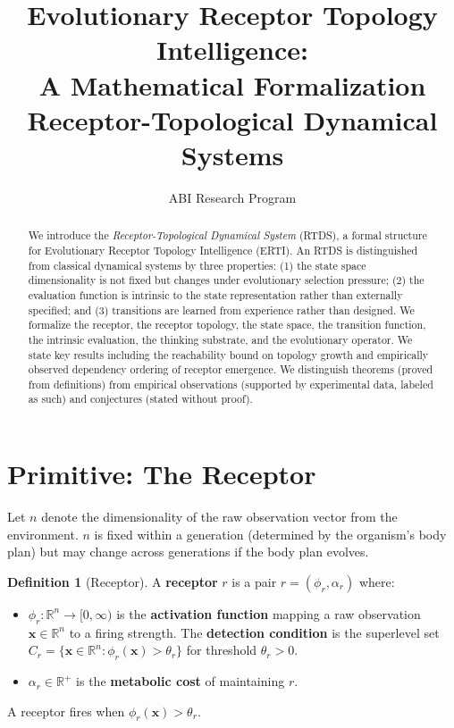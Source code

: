 \documentclass[12pt]{article}
\title{\textbf{Evolutionary Receptor Topology Intelligence:\\
A Mathematical Formalization}\\
\large Receptor-Topological Dynamical Systems}
\author{ABI Research Program}
\date{}
\theoremstyle{definition}
\newtheorem{definition}{Definition}
\begin{document}
\maketitle

\begin{abstract}
We introduce the \textit{Receptor-Topological Dynamical System} (RTDS), a formal structure
for Evolutionary Receptor Topology Intelligence (ERTI). An RTDS is distinguished from
classical dynamical systems by three properties: (1) the state space dimensionality is not
fixed but changes under evolutionary selection pressure; (2) the evaluation function is
intrinsic to the state representation rather than externally specified; and (3) transitions
are learned from experience rather than designed. We formalize the receptor, the receptor
topology, the state space, the transition function, the intrinsic evaluation, the thinking
substrate, and the evolutionary operator. We state key results including the reachability
bound on topology growth and empirically observed dependency ordering of receptor
emergence. We distinguish theorems (proved from definitions) from empirical observations
(supported by experimental data, labeled as such) and conjectures (stated without proof).
\end{abstract}

\tableofcontents
\newpage

\section{Primitive: The Receptor}

Let $n$ denote the dimensionality of the raw observation vector from the environment.
$n$ is fixed within a generation (determined by the organism's body plan) but may change
across generations if the body plan evolves.

\begin{definition}[Receptor]
A \textbf{receptor} $r$ is a pair $r = (\phi_r, \alpha_r)$ where:
\begin{itemize}
    \item $\phi_r : \mathbb{R}^n \to [0,\infty)$ is the \textbf{activation function} mapping
    a raw observation $\mathbf{x} \in \mathbb{R}^n$ to a firing strength. The
    \textbf{detection condition} is the superlevel set
    $C_r = \{\mathbf{x} \in \mathbb{R}^n : \phi_r(\mathbf{x}) > \theta_r\}$ for
    threshold $\theta_r > 0$.
    \item $\alpha_r \in \mathbb{R}^+$ is the \textbf{metabolic cost} of maintaining $r$.
\end{itemize}
A receptor fires when $\phi_r(\mathbf{x}) > \theta_r$.
\end{definition}
\end{document}
